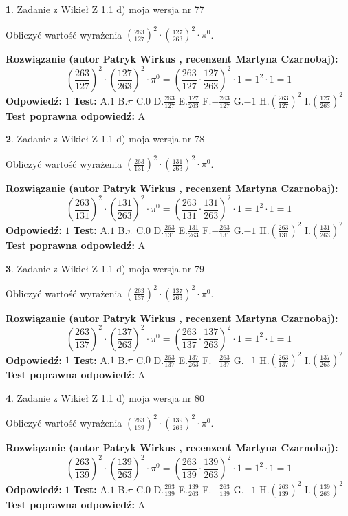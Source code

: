 \documentclass[12pt, a4paper]{article}
\theoremstyle{definition} %
\newtheorem{zad}{}
\newcommand{\zadStart}[1]{\begin{zad}#1\newline}
\newcommand{\zadStop}{\end{zad}}
\newcommand{\rozwStart}[2]{\noindent \textbf{Rozwiązanie (autor #1 , recenzent #2): }\newline}
\newcommand{\rozwStop}{\newline}
\newcommand{\odpStart}{\noindent \textbf{Odpowiedź:}\newline}
\newcommand{\odpStop}{\newline}
\newcommand{\testStart}{\noindent \textbf{Test:}\newline}
\newcommand{\testStop}{\newline}
\newcommand{\kluczStart}{\noindent \textbf{Test poprawna odpowiedź:}\newline}
\newcommand{\kluczStop}{\newline}
\begin{document}
\zadStart{Zadanie z Wikieł Z 1.1 d) moja wersja nr 77}

Obliczyć wartość wyrażenia $(\frac{263}{127})^{2} \cdot (\frac{127}{263})^{2} \cdot \pi^{0}$.
\zadStop
\rozwStart{Patryk Wirkus}{Martyna Czarnobaj}
$$(\frac{263}{127})^{2} \cdot (\frac{127}{263})^{2} \cdot \pi^{0} = (\frac{263}{127} \cdot \frac{127}{263})^{2} \cdot 1 = 1^{2} \cdot 1 = 1$$
\rozwStop
\odpStart
$1$
\odpStop
\testStart
A.$1$ B.$\pi$ C.$0$ D.$\frac{263}{127}$ E.$\frac{127}{263}$
F.$-\frac{263}{127}$ G.$-1$
H.$(\frac{263}{127})^{2}$
I.$(\frac{127}{263})^{2}$
\testStop
\kluczStart
A
\kluczStop



\zadStart{Zadanie z Wikieł Z 1.1 d) moja wersja nr 78}

Obliczyć wartość wyrażenia $(\frac{263}{131})^{2} \cdot (\frac{131}{263})^{2} \cdot \pi^{0}$.
\zadStop
\rozwStart{Patryk Wirkus}{Martyna Czarnobaj}
$$(\frac{263}{131})^{2} \cdot (\frac{131}{263})^{2} \cdot \pi^{0} = (\frac{263}{131} \cdot \frac{131}{263})^{2} \cdot 1 = 1^{2} \cdot 1 = 1$$
\rozwStop
\odpStart
$1$
\odpStop
\testStart
A.$1$ B.$\pi$ C.$0$ D.$\frac{263}{131}$ E.$\frac{131}{263}$
F.$-\frac{263}{131}$ G.$-1$
H.$(\frac{263}{131})^{2}$
I.$(\frac{131}{263})^{2}$
\testStop
\kluczStart
A
\kluczStop



\zadStart{Zadanie z Wikieł Z 1.1 d) moja wersja nr 79}

Obliczyć wartość wyrażenia $(\frac{263}{137})^{2} \cdot (\frac{137}{263})^{2} \cdot \pi^{0}$.
\zadStop
\rozwStart{Patryk Wirkus}{Martyna Czarnobaj}
$$(\frac{263}{137})^{2} \cdot (\frac{137}{263})^{2} \cdot \pi^{0} = (\frac{263}{137} \cdot \frac{137}{263})^{2} \cdot 1 = 1^{2} \cdot 1 = 1$$
\rozwStop
\odpStart
$1$
\odpStop
\testStart
A.$1$ B.$\pi$ C.$0$ D.$\frac{263}{137}$ E.$\frac{137}{263}$
F.$-\frac{263}{137}$ G.$-1$
H.$(\frac{263}{137})^{2}$
I.$(\frac{137}{263})^{2}$
\testStop
\kluczStart
A
\kluczStop



\zadStart{Zadanie z Wikieł Z 1.1 d) moja wersja nr 80}

Obliczyć wartość wyrażenia $(\frac{263}{139})^{2} \cdot (\frac{139}{263})^{2} \cdot \pi^{0}$.
\zadStop
\rozwStart{Patryk Wirkus}{Martyna Czarnobaj}
$$(\frac{263}{139})^{2} \cdot (\frac{139}{263})^{2} \cdot \pi^{0} = (\frac{263}{139} \cdot \frac{139}{263})^{2} \cdot 1 = 1^{2} \cdot 1 = 1$$
\rozwStop
\odpStart
$1$
\odpStop
\testStart
A.$1$ B.$\pi$ C.$0$ D.$\frac{263}{139}$ E.$\frac{139}{263}$
F.$-\frac{263}{139}$ G.$-1$
H.$(\frac{263}{139})^{2}$
I.$(\frac{139}{263})^{2}$
\testStop
\kluczStart
A
\kluczStop
\end{document}
